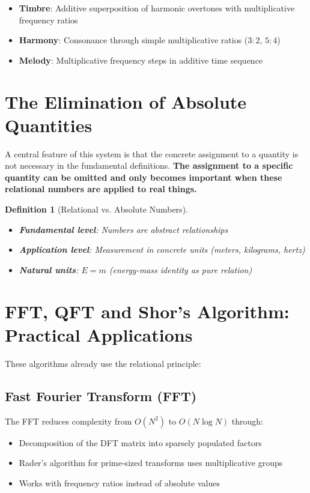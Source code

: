 \documentclass[11pt,a4paper]{article}
\newtheorem{definition}{Definition}[section]
\begin{document}
	\begin{itemize}
		\item \textbf{Timbre}: Additive superposition of harmonic overtones with multiplicative frequency ratios
		\item \textbf{Harmony}: Consonance through simple multiplicative ratios ($3:2$, $5:4$)
		\item \textbf{Melody}: Multiplicative frequency steps in additive time sequence
	\end{itemize}
	
	\section{The Elimination of Absolute Quantities}
	
	A central feature of this system is that the concrete assignment to a quantity is not necessary in the fundamental definitions. \textbf{The assignment to a specific quantity can be omitted and only becomes important when these relational numbers are applied to real things.}
	
	\begin{definition}[Relational vs. Absolute Numbers]
		\begin{itemize}
			\item \textbf{Fundamental level}: Numbers are abstract relationships
			\item \textbf{Application level}: Measurement in concrete units (meters, kilograms, hertz)
			\item \textbf{Natural units}: $E = m$ (energy-mass identity as pure relation)
		\end{itemize}
	\end{definition}
	
	\section{FFT, QFT and Shor's Algorithm: Practical Applications}
	
	These algorithms already use the relational principle:
	
	\subsection{Fast Fourier Transform (FFT)}
	
	The FFT reduces complexity from $O(N^2)$ to $O(N \log N)$ through:
	\begin{itemize}
		\item Decomposition of the DFT matrix into sparsely populated factors
		\item Rader's algorithm for prime-sized transforms uses multiplicative groups
		\item Works with frequency ratios instead of absolute values
	\end{itemize}
	
\end{document}
